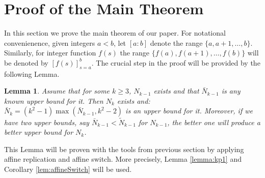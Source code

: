 \documentclass[reqno,12pt]{amsart}
\theoremstyle{plain}
\newtheorem{lemma}[theorem]{Lemma}
\theoremstyle{definition}
\theoremstyle{remark}
\begin{document}

\section{Proof of the Main Theorem}\label{sec:mainThms}


In this section we prove the main theorem of our paper.   For notational convenienence, given integers $a < b$, let $[a:b]$ denote 
the range $\{a, a+1, \ldots, b\}$. Similarly, for integer function $f(s)$ the range
$\{f(a), f(a+1), \ldots, f(b)\}$ will be denoted by $[f(s)]^b_{s=a}$. 
The crucial step in the proof will be provided by the following Lemma.

\begin{lemma}\label{mainLemma}
Assume that for some $k \geq 3$, $N_{k-1}$ exists and that $\bar{N}_{k-1}$ is any known upper bound for it. 
Then $N_k$ exists and:
$\bar{N}_k =  (k^2-1)\max(\bar{N}_{k-1},k^2-2)$ is an upper bound for it. Moreover, if we have two upper bounds, say $\bar{N}_{k-1} < \tilde{N}_{k-1}$
for $N_{k-1}$, the better one will produce a better upper bound for $N_{k}$.
\end{lemma}

This Lemma will be proven with the tools from previous section by  applying affine replication and affine switch.
More precisely, Lemma \ref{lemma:kp1} and Corollary  \ref{lem:affineSwitch} will be used.

\end{document}
